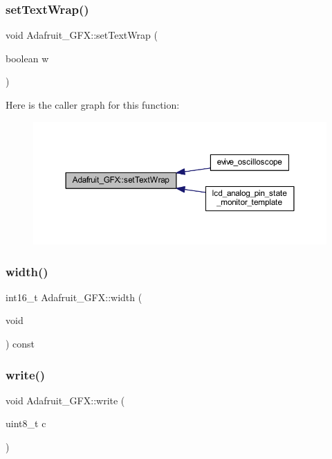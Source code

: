 \subsubsection{\texorpdfstring{set\+Text\+Wrap()}{setTextWrap()}}
{\footnotesize\ttfamily void Adafruit\+\_\+\+G\+F\+X\+::set\+Text\+Wrap (\begin{DoxyParamCaption}\item[{boolean}]{w }\end{DoxyParamCaption})}

Here is the caller graph for this function\+:
\nopagebreak
\begin{figure}[H]
\begin{center}
\leavevmode
\includegraphics[width=350pt]{d9/d97/class_adafruit___g_f_x_aeeacd62bf26f3e7abbdc4b5b50faa6fa_icgraph}
\end{center}
\end{figure}
\mbox{\label{class_adafruit___g_f_x_a324b5361e7198ef0e79eaf4c80bddfc7}} 
\subsubsection{\texorpdfstring{width()}{width()}}
{\footnotesize\ttfamily int16\+\_\+t Adafruit\+\_\+\+G\+F\+X\+::width (\begin{DoxyParamCaption}\item[{void}]{ }\end{DoxyParamCaption}) const}

\mbox{\label{class_adafruit___g_f_x_af4978ea0cf0c0b0540567e82d8fa9900}} 
\subsubsection{\texorpdfstring{write()}{write()}}
{\footnotesize\ttfamily void Adafruit\+\_\+\+G\+F\+X\+::write (\begin{DoxyParamCaption}\item[{uint8\+\_\+t}]{c }\end{DoxyParamCaption})\hspace{0.3cm}{\ttfamily [virtual]}}

